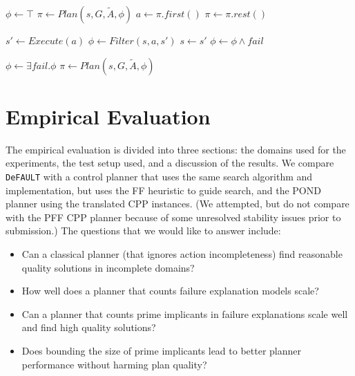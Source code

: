 \documentclass{article}
\def\citep#1{\cite{#1}}
\def\FFRISKY{{\tt DeFAULT}}
\begin{document}
\begin{algorithm}
\caption{$PessimisticAgent(s, G, \tilde{A})$}\label{alg:replan}
\begin{algorithmic}
\STATE $\phi \gets \top$
\STATE $\pi \gets Plan(s, G, \tilde{A}, \phi)$
\STATE $a \gets \pi.first()$
\STATE $\pi \gets \pi.rest()$

	\STATE $s ' \gets Execute(a)$
	\STATE $\phi \gets Filter(s, a, s')$
	\STATE $s \gets s'$
\ELSE
	\STATE $\phi \gets \phi \wedge fail$
\ENDIF

	\STATE $\phi \gets \exists fail . \phi$
	\STATE $\pi \gets Plan(s, G, \tilde{A}, \phi)$
\ENDIF
\ENDWHILE
\end{algorithmic}
\end{algorithm}


\section{Empirical Evaluation}\label{sec:empirical}
%
The empirical evaluation is divided into three sections:  the domains used for the experiments, the test setup used, and a discussion of the results. We compare \FFRISKY{} with a control planner that uses the same search algorithm and implementation, but uses the FF heuristic to guide search, and the POND planner using the translated CPP instances. (We attempted, but do not compare with the PFF \citep{pff} CPP planner because of some unresolved stability issues prior to submission.)  The questions that we would like to answer include: 
\begin{itemize}
\item Can a classical planner (that ignores action incompleteness) find reasonable quality solutions in incomplete domains?
\item How well does a planner that counts failure explanation models scale?
\item Can a planner that counts prime implicants in failure explanations scale well and find high quality solutions?
\item Does bounding the size of prime implicants lead to better planner performance without harming plan quality?
\end{itemize}
\end{document}
